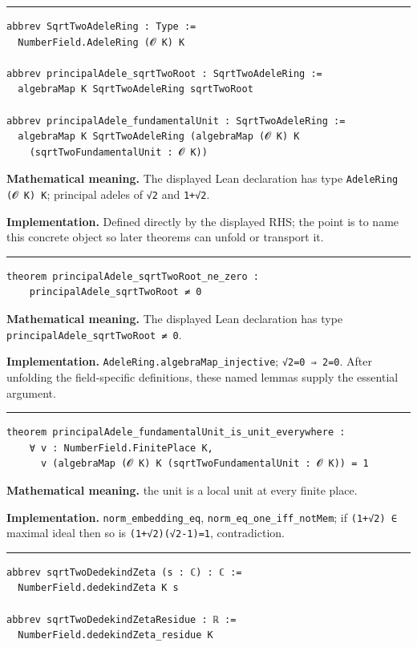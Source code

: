 \documentclass[UTF8,a4paper,11pt,fontset=fandol]{ctexart}
\theoremstyle{definition}
\newcommand{\statementsep}{\par\medskip\hrule\medskip}
\begin{document}
\statementsep
\begin{verbatim}
abbrev SqrtTwoAdeleRing : Type :=
  NumberField.AdeleRing (𝓞 K) K

abbrev principalAdele_sqrtTwoRoot : SqrtTwoAdeleRing :=
  algebraMap K SqrtTwoAdeleRing sqrtTwoRoot

abbrev principalAdele_fundamentalUnit : SqrtTwoAdeleRing :=
  algebraMap K SqrtTwoAdeleRing (algebraMap (𝓞 K) K
    (sqrtTwoFundamentalUnit : 𝓞 K))
\end{verbatim}
\noindent\textbf{Mathematical meaning.} The displayed Lean declaration has type \texttt{AdeleRing (𝓞 K) K}; principal adeles of \texttt{√2} and \texttt{1+√2}.\par
\noindent\textbf{Implementation.} Defined directly by the displayed RHS; the point is to name this concrete object so later theorems can unfold or transport it.\par
\statementsep
\begin{verbatim}
theorem principalAdele_sqrtTwoRoot_ne_zero :
    principalAdele_sqrtTwoRoot ≠ 0
\end{verbatim}
\noindent\textbf{Mathematical meaning.} The displayed Lean declaration has type \texttt{principalAdele\_\allowbreak{}sqrtTwoRoot ≠ 0}.\par
\noindent\textbf{Implementation.} \texttt{AdeleRing.\allowbreak{}algebraMap\_\allowbreak{}injective}; \texttt{√2=0 ⇒ 2=0}. After unfolding the field-specific definitions, these named lemmas supply the essential argument.\par
\statementsep
\begin{verbatim}
theorem principalAdele_fundamentalUnit_is_unit_everywhere :
    ∀ v : NumberField.FinitePlace K,
      v (algebraMap (𝓞 K) K (sqrtTwoFundamentalUnit : 𝓞 K)) = 1
\end{verbatim}
\noindent\textbf{Mathematical meaning.} the unit is a local unit at every finite place.\par
\noindent\textbf{Implementation.} \texttt{norm\_\allowbreak{}embedding\_\allowbreak{}eq}, \texttt{norm\_\allowbreak{}eq\_\allowbreak{}one\_\allowbreak{}iff\_\allowbreak{}notMem}; if \texttt{(1+√2) ∈} maximal ideal then so is \texttt{(1+√2)(√2-1)=1}, contradiction.\par
\statementsep
\begin{verbatim}
abbrev sqrtTwoDedekindZeta (s : ℂ) : ℂ :=
  NumberField.dedekindZeta K s

abbrev sqrtTwoDedekindZetaResidue : ℝ :=
  NumberField.dedekindZeta_residue K
\end{verbatim}
\end{document}
